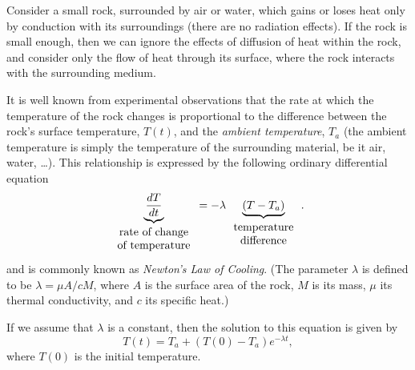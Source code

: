 \begin{example}
  \label{lab1:exm:conduction}
  Consider a small rock, surrounded by air or water, which gains or
  loses heat only by conduction with its surroundings 
  (\ie there are no radiation effects).
  If the rock is small enough, then we can ignore the effects of
  diffusion of heat within the rock, and consider only the flow of heat
  through its surface, where the rock interacts with the surrounding
  medium.  

  It is well known from experimental observations that the 
  rate at which the temperature of the rock changes
  is proportional to 
  the difference between the rock's surface temperature, $T(t)$, 
    and the \emph{ambient temperature}, $T_a$
  (the ambient temperature is
  simply the temperature of the surrounding material, be it air,
  water, \dots).
  This relationship is expressed by the following ordinary
  differential equation
  \begin{equation}
    \underbrace{\frac{dT}{dt}}_{\begin{array}{c} 
                                \mbox{\rm rate of change}\\
                                \mbox{\rm of temperature}
                                \end{array}}
    = -\lambda \underbrace{(T-T_a)}_{\begin{array}{c} 
                                \mbox{\rm temperature}\\
                                \mbox{\rm difference}
                                \end{array}} .
    \label{lab1:eq:conduction1d}
  \end{equation}
  and is commonly known as \emph{Newton's Law of Cooling}.
  (The parameter $\lambda$ is defined to be $\lambda = \mu A/cM$, where
  $A$ is the surface area of the rock, 
  $M$ is its mass, $\mu$ its thermal conductivity, and $c$ its
  specific heat.)

  
  If we assume that $\lambda$ is a constant, then the solution to this
  equation is given by 
  \begin{equation}
    T(t) = T_a + (T(0)-T_a)e^{-\lambda t},
    \label{lab1:eq:conduction-soln}
  \end{equation}
  where $T(0)$ is the initial temperature.  
  

\end{example}
